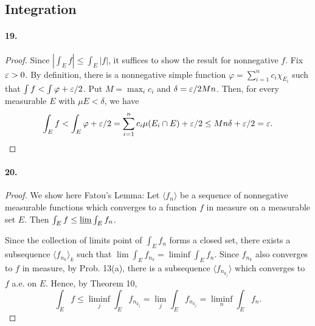 \subsection{Integration}
  \paragraph{19.}
  \begin{proof}
    Since $|\int_E f|\le \int_E|f|$, it suffices to show the result for
    nonnegative $f$. Fix $\varepsilon>0$. By definition, there is a nonnegative simple
    function $\varphi=\sum_{i=1}^n c_i\chi_{E_i}$ such that $\int f<\int
    \varphi+\varepsilon/2$. Put $M=\max_ic_i$ and $\delta=\varepsilon/2Mn$. Then, for every
    measurable $E$ with $\mu E<\delta$, we have
    \[
      \int_E f<\int_E\varphi+\varepsilon/2=
      \sum_{i=1}^nc_i\mu(E_i\cap E)+\varepsilon/2\le
      Mn\delta+\varepsilon/2=\varepsilon.
    \]
  \end{proof}
  
  \paragraph{20.}
  \begin{proof}
    We show here Fatou's Lemma: Let $\langle f_n\rangle$ be a sequence of 
    nonnegative measurable functions which converges to a function $f$ in
    measure on a measurable set $E$. Then $\int_E f\le\operatorname*{\underline{lim}}\int_E f_n$.\par
    Since the collection of limits point of $\int_E f_n$ forms a closed set, 
    there exists a subsequence $\langle f_{n_k}\rangle_k$ such that $\lim\int_E
    f_{n_k}=\liminf\int_E f_n$. Since $f_{n_k}$ also converges to $f$ in 
    measure, by Prob. 13(a), there is a subsequence $\langle f_{n_{k_j}}\rangle$
    which converges to $f$ a.e. on $E$. Hence, by Theorem 10,
    \[
      \int_E f\le \liminf_j \int_E f_{n_{k_j}}=
      \lim_j \int_E f_{n_{k_j}}=
      \liminf_n\int_E f_n.
    \]
  \end{proof}
  

